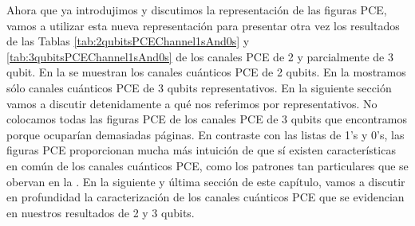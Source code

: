 
Ahora que ya introdujimos y discutimos la representación de las figuras PCE,
vamos a utilizar esta nueva representación para presentar otra vez 
los resultados de las Tablas \ref{tab:2qubitsPCEChannel1sAnd0s} 
y \ref{tab:3qubitsPCEChannel1sAnd0s} de los canales PCE de 2 y 
parcialmente de 3 qubit.
En la  se muestran los canales cuánticos PCE de 2 qubits. 
En la  
mostramos sólo canales cuánticos PCE de 3 qubits representativos. En la siguiente 
sección vamos a discutir detenidamente a qué nos referimos por representativos.
No colocamos todas las figuras PCE de los canales PCE de 3 qubits que 
encontramos porque ocuparían demasiadas páginas.
En contraste con las listas de 1's y 0's, las figuras PCE proporcionan mucha 
más intuición de que sí existen características en común de los canales 
cuánticos PCE, como los patrones tan particulares que se obervan en la
. En la siguiente y última sección 
de este capítulo, vamos a discutir en profundidad la caracterización de los 
canales cuánticos PCE que se evidencian en nuestros resultados de 2 y 3 qubits.


\newpage


